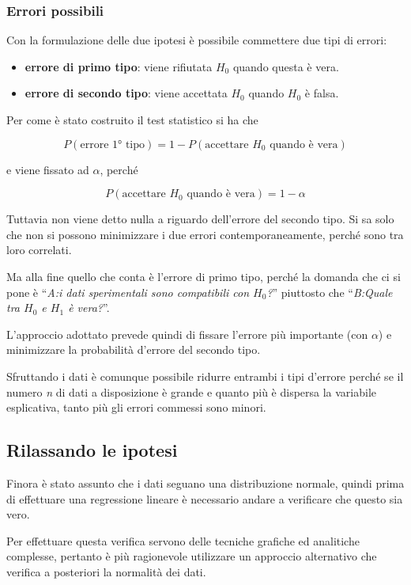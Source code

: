 \subsubsection{Errori possibili}\label{errori-possibili}

Con la formulazione delle due ipotesi è possibile commettere due tipi di
errori:

\begin{itemize}
\item
  \textbf{errore di primo tipo}: viene rifiutata $ H_0 $ quando questa è
  vera.
\item
  \textbf{errore di secondo tipo}: viene accettata $ H_0 $ quando $ H_0 $ è falsa.
\end{itemize}

Per come è stato costruito il test statistico si ha che

$$
P(\text{errore 1° tipo}) = 1 - P(\text{accettare } H_0 \text{ quando è vera})
$$

e viene fissato ad $\alpha$, perché

$$ P(\text{accettare } H_0 \text{ quando è vera}) = 1- \alpha $$

Tuttavia non viene detto nulla a riguardo dell'errore del secondo tipo.
Si sa solo che non si possono minimizzare i due errori
contemporaneamente, perché sono tra loro correlati.

Ma alla fine quello che conta è l'errore di primo tipo, perché la
domanda che ci si pone è ``\emph{A:i dati sperimentali sono compatibili
con $ H_0 $?}'' piuttosto che ``\emph{B:Quale tra $ H_0 $ e $ H_1 $ è vera?}''.

L'approccio adottato prevede quindi di fissare l'errore più importante
(con $\alpha$) e minimizzare la probabilità d'errore del secondo
tipo.

Sfruttando i dati è comunque possibile ridurre entrambi i tipi d'errore
perché se il numero \emph{n} di dati a disposizione è grande e quanto
più è dispersa la variabile esplicativa, tanto più gli errori commessi
sono minori.

\subsection{Rilassando le ipotesi}\label{commenti}

Finora è stato assunto che i dati seguano una distribuzione normale,
quindi prima di effettuare una regressione lineare è necessario andare a
verificare che questo sia vero.

Per effettuare questa verifica servono delle tecniche grafiche ed
analitiche complesse, pertanto è più ragionevole utilizzare un approccio
alternativo che verifica a posteriori la normalità dei dati.

